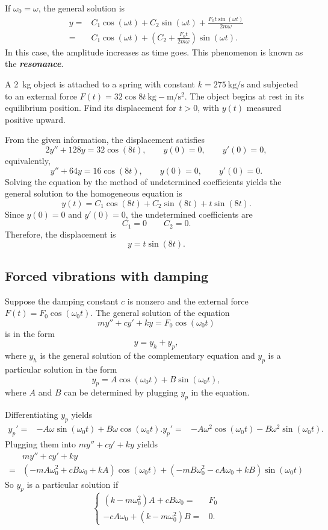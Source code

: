 If $\omega_0=\omega$, the general solution is
\[
  \begin{aligned}
    y=&C_1\cos(\omega t)+C_2\sin(\omega t)+\frac{F_0t\sin(\omega t)}{2m \omega}\\
    =&C_1\cos(\omega t)+\left(C_2+\frac{F_0t}{2m \omega}\right)\sin(\omega t).
\end{aligned}
\]
In this case, the amplitude increases as time goes.
This phenomenon is known as the \emph{\textbf{resonance}}.

\begin{example}
  A \SI{2}{\kg} object is attached to a spring with constant $k = \SI{275}{\kg\per\second}$ and subjected to an external force $F(t)=32\cos{8t}~\si{\kg-\meter\per\square\second}$. The object begins at rest in its equilibrium position. Find its displacement for $t > 0$, with $y(t)$ measured positive upward.
\end{example}
\begin{solution}
  From the given information, the displacement satisfies
  \[2y''+128y=32\cos(8t),\qquad y(0)=0,\qquad y'(0)=0,\]
  equivalently,
  \[y''+64y=16\cos(8t),\qquad y(0)=0,\qquad y'(0)=0.\]
  Solving the equation by the method of undetermined coefficients yields the general solution to the homogeneous equation is 
  \[y(t)=C_1\cos(8t)+C_2\sin(8t)+t\sin(8t).\]
  Since $y(0)=0$ and $y'(0)=0$, the undetermined coefficients are
  \[C_1=0\qquad C_2=0.\]
  Therefore, the displacement is
  \[y=t\sin(8t).\]
\end{solution}

\subsection*{Forced vibrations with damping}

Suppose the damping constant $c$ is nonzero and the external force $F(t)=F_0\cos(\omega_0t)$. The general solution of the equation 
\[my''+cy'+ky=F_0\cos(\omega_0 t)\]
is in the form
\[y=y_h+y_p,\]
where $y_h$ is the general solution of the complementary equation and $y_p$ is a particular solution in the form
\[y_p=A\cos(\omega_0 t)+B\sin(\omega_0 t),\]
where $A$ and $B$ can be determined by plugging $y_p$ in the equation.

Differentiating $y_p$ yields
\[
  \begin{aligned}
    y_p'=&-A\omega\sin(\omega_0 t)+B\omega\cos(\omega_0 t).
    y_p'=&-A\omega^2\cos(\omega_0 t)-B\omega^2\sin(\omega_0 t).
  \end{aligned}
\]
Plugging them into $my''+cy'+ky$ yields
\[
  \begin{aligned}
    &my''+cy'+ky\\
    =&(-mA\omega_0^2+cB\omega_0+kA)\cos(\omega_0 t)+(-mB\omega_0^2-cA\omega_0+kB)\sin(\omega_0 t)
  \end{aligned}
\]
So $y_p$ is a particular solution if
\[
  \left\{
\begin{aligned}
  (k-m\omega_0^2)A+cB\omega_0=&F_0\\
  -cA\omega_0+(k-m\omega_0^2)B=&0.
\end{aligned} \right. 
\]

